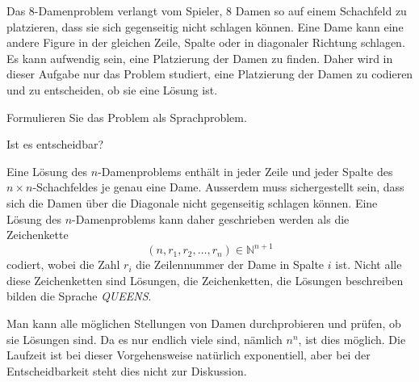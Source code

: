 Das 8-Damenproblem verlangt vom Spieler, 8 Damen so auf einem Schachfeld
zu platzieren, dass sie sich gegenseitig nicht schlagen können.
Eine Dame kann eine andere Figure in der gleichen Zeile, Spalte oder
in diagonaler Richtung schlagen.
Es kann aufwendig sein, eine Platzierung der Damen zu finden.
Daher wird in dieser Aufgabe nur das Problem studiert, eine Platzierung
der Damen zu codieren und zu entscheiden, ob sie eine Lösung ist.
\begin{teilaufgaben}
\item
Formulieren Sie das Problem als Sprachproblem.
\item
Ist es entscheidbar?
\end{teilaufgaben}


\begin{loesung}
\begin{teilaufgaben}
\item
Eine Lösung des $n$-Damenproblems enthält in jeder Zeile und
jeder Spalte des $n\times n$-Schachfeldes je genau eine Dame.
Ausserdem muss sichergestellt sein, dass sich die Damen über
die Diagonale nicht gegenseitig schlagen können.
Eine Lösung des $n$-Damenproblems kann daher geschrieben werden
als die Zeichenkette
\[
(n,r_1,r_2,\dots,r_n) \in \mathbb{N}^{n+1}
\]
codiert, wobei die Zahl $r_i$ die Zeilennummer der Dame in Spalte $i$
ist.
Nicht alle diese Zeichenketten sind Lösungen, die Zeichenketten, die
Lösungen beschreiben bilden die Sprache \textit{QUEENS}.
\item
Man kann alle möglichen Stellungen von Damen durchprobieren und prüfen,
ob sie Lösungen sind.
Da es nur endlich viele sind, nämlich $n^n$, ist dies möglich.
Die Laufzeit ist bei dieser Vorgehensweise natürlich exponentiell, aber
bei der Entscheidbarkeit steht dies nicht zur Diskussion.
\qedhere
\end{teilaufgaben}
\end{loesung}
